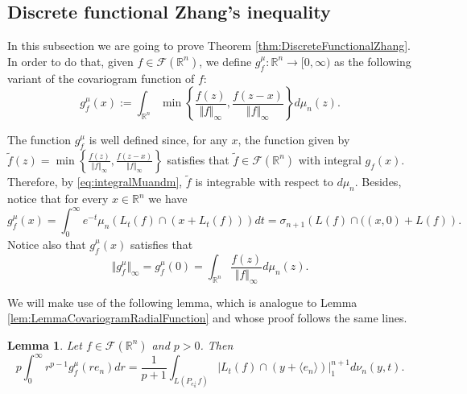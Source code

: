 \documentclass{amsart}
\newcommand{\R}{\mathbb R}
\newcommand{\norma}[1]{\left\Vert#1\right\Vert}
\newtheorem{lemma}{Lemma}[section]
\theoremstyle{remark}
\theoremstyle{definition}
\newtheorem*{Remark}{Remark}
\numberwithin{equation}{section}
\begin{document}





\subsection{Discrete functional Zhang's inequality}




In this subsection we are going to prove Theorem \ref{thm:DiscreteFunctionalZhang}. In order to do that, given $f\in\mathcal{F}(\R^n)$, we define $g_f^\mu:\R^n\to[0,\infty)$ as the following variant of the covariogram function of $f$:
$$
g_f^{\mu}(x):=\int_{\R^n}\min\left\{\frac{f(z)}{\Vert f\Vert_\infty},\frac{f(z-x)}{\Vert f\Vert_\infty}\right\}d\mu_n(z).
$$

The function $g_f^\mu$ is well defined since, for any $x$, the function given by $\tilde{f}(z)=\min\left\{\frac{f(z)}{\Vert f\Vert_\infty},\frac{f(z-x)}{\Vert f\Vert_\infty}\right\}$ satisfies that $\tilde{f}\in\mathcal{F}(\R^n)$ with integral $g_f(x)$. Therefore, by \eqref{eq:integralMuandm}, $\tilde{f}$ is integrable with respect to $d\mu_n$. Besides, notice that for every $x\in\R^n$ we have
\begin{equation}\label{eq:CovariogramMu}
g_f^{\mu}(x)=\int_0^\infty e^{-t}\mu_n\left(L_t(f)\cap(x+L_t(f))\right)dt=\sigma_{n+1}\left(L(f)\cap((x,0)+L(f)\right).
\end{equation}
Notice also that $g_f^{\mu}(x)$ satisfies that
$$
\Vert g_f^\mu\Vert_\infty=g_f^\mu(0)=\int_{\R^n}\frac{f(z)}{\Vert f\Vert_\infty}d\mu_n(z).
$$

We will make use of the following lemma, which is analogue to Lemma \ref{lem:LemmaCovariogramRadialFunction} and whose proof follows the same lines.

\begin{lemma}\label{lem:IdentityDiscrete}
Let $f\in\mathcal{F}(\R^n)$ and $p>0$. Then
$$
p \int_0^{\infty} r^{p-1}g_f^\mu(re_n)dr=\frac{1}{p+1}\int_{L(P_{e_n^\perp}f)}|L_t(f)\cap(y+\langle e_n\rangle)|_1^{n+1}d\nu_n(y,t).
$$
\end{lemma}
\end{document}
